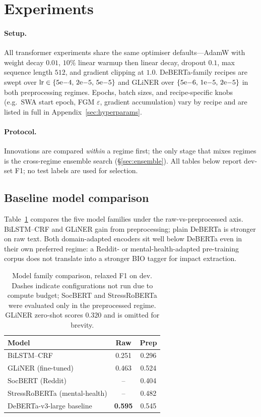 \documentclass[11pt]{article}
\begin{document}
\section{Experiments}
\label{sec:exp}

\paragraph{Setup.} All transformer experiments share the same
optimiser defaults---AdamW with weight decay $0.01$, $10\%$ linear
warmup then linear decay, dropout $0.1$, max sequence length $512$,
and gradient clipping at $1.0$. DeBERTa-family recipes are swept
over $\mathrm{lr}\in\{5{\rm e}{-4},\,2{\rm e}{-5},\,5{\rm e}{-5}\}$
and GLiNER over $\{5{\rm e}{-6},\,1{\rm e}{-5},\,2{\rm e}{-5}\}$ in
both preprocessing regimes. Epochs, batch sizes, and recipe-specific
knobs (e.g.\ SWA start epoch, FGM $\varepsilon$, gradient
accumulation) vary by recipe and are listed in full in
Appendix~\ref{sec:hyperparams}.

\paragraph{Protocol.} Innovations are compared \emph{within} a
regime first; the only stage that mixes regimes is the cross-regime
ensemble search (\S\ref{sec:ensemble}). All tables below report dev-set
F1; no test labels are used for selection.

\subsection{Baseline model comparison}

Table~\ref{tab:backbones} compares the five model families under the
raw-vs-preprocessed axis. BiLSTM--CRF and GLiNER gain from preprocessing;
plain DeBERTa is stronger on raw text. Both domain-adapted encoders sit
well below DeBERTa even in their own preferred regime: a Reddit- or
mental-health-adapted pre-training corpus does not translate into a
stronger BIO tagger for impact extraction.

\begin{table}[t]
\centering\small
\begin{tabular}{lcc}
\toprule
Model & Raw & Prep \\
\midrule
BiLSTM--CRF & 0.251 & 0.296 \\
GLiNER (fine-tuned) & 0.463 & 0.524 \\
SocBERT (Reddit) & -- & 0.404 \\
StressRoBERTa (mental-health) & -- & 0.482 \\
DeBERTa-v3-large baseline & \textbf{0.595} & 0.545 \\
\bottomrule
\end{tabular}
\caption{Model family comparison, relaxed F1 on dev. Dashes indicate
configurations not run due to compute budget; SocBERT and StressRoBERTa
were evaluated only in the preprocessed regime. GLiNER zero-shot scores
$0.320$ and is omitted for brevity.}
\label{tab:backbones}
\end{table}
\end{document}
